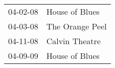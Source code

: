 \begin{supertabular}{p{0.25\columnwidth}p{0.75\columnwidth}}
 04-02-08 &   House of Blues \\
 04-03-08 &  The Orange Peel \\
 04-11-08 &   Calvin Theatre \\
 04-09-09 &   House of Blues \\
\end{supertabular}
